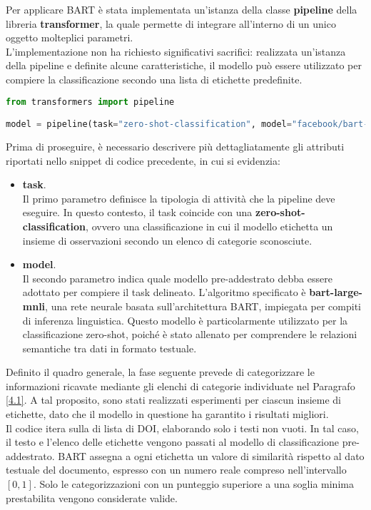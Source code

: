 Per applicare BART è stata implementata un'istanza della classe \textbf{pipeline} della libreria \textbf{transformer}, la quale permette di integrare all'interno di un unico oggetto molteplici parametri. \vspace{7pt} \\
L'implementazione non ha richiesto significativi sacrifici: realizzata un'istanza della pipeline e definite alcune caratteristiche, il modello può essere utilizzato per compiere la classificazione secondo una lista di etichette predefinite.
\begin{lstlisting}[language=python, caption=Creazione di un'istanza del modello BART]
from transformers import pipeline

model = pipeline(task="zero-shot-classification", model="facebook/bart-large-mnli")
\end{lstlisting}
Prima di proseguire, è necessario descrivere più dettagliatamente gli attributi riportati nello snippet di codice precedente, in cui si evidenzia:
\begin{itemize}
    \renewcommand{\labelitemi}{-}
    \item \textbf{task}. \\
    Il primo parametro definisce la tipologia di attività che la pipeline deve eseguire. In questo contesto, il task coincide con una \textbf{zero-shot-classification}, ovvero una classificazione in cui il modello etichetta un insieme di osservazioni secondo un elenco di categorie sconosciute.
    \item \textbf{model}. \\
    Il secondo parametro indica quale modello pre-addestrato debba essere adottato per compiere il task delineato. L'algoritmo specificato è \textbf{bart-large-mnli}, una rete neurale basata sull'architettura BART, impiegata per compiti di inferenza linguistica. Questo modello è particolarmente utilizzato per la classificazione zero-shot, poiché è stato allenato per comprendere le relazioni semantiche tra dati in formato testuale.
\end{itemize}
Definito il quadro generale, la fase seguente prevede di categorizzare le informazioni ricavate mediante gli elenchi di categorie individuate nel Paragrafo \ref{4.1}. A tal proposito, sono stati realizzati esperimenti per ciascun insieme di etichette, dato che il modello in questione ha garantito i risultati migliori. \vspace{7pt} \\
Il codice itera sulla di lista di DOI, elaborando solo i testi non vuoti. In tal caso, il testo e l'elenco delle etichette vengono passati al modello di classificazione pre-addestrato. BART assegna a ogni etichetta un valore di similarità rispetto al dato testuale del documento, espresso con un numero reale compreso nell'intervallo $[0,1]$. Solo le categorizzazioni con un punteggio superiore a una soglia minima prestabilita vengono considerate valide. 
